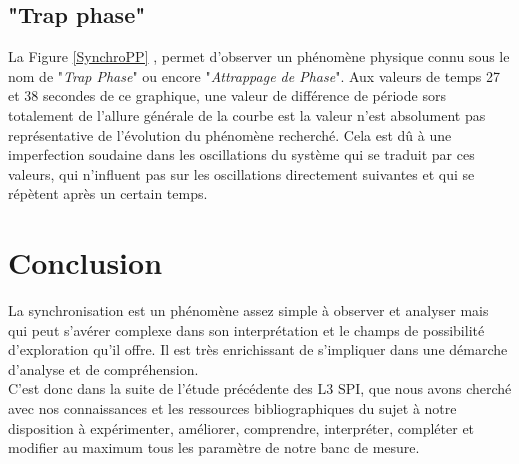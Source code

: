 \documentclass[a4paper,11pt]{report}
\begin{document}
\section{"Trap phase"}
La Figure \ref{SynchroPP} , permet d'observer un phénomène physique connu sous le nom de "{\it Trap Phase}" ou encore "{\it Attrappage de Phase}". Aux valeurs de temps 27 et 38 secondes de ce graphique, une valeur de différence de période sors totalement de l'allure générale de la courbe est la valeur n'est absolument pas représentative de l'évolution du phénomène recherché. Cela est dû à une imperfection soudaine dans les oscillations du système qui se traduit par ces valeurs, qui n'influent pas sur les oscillations directement suivantes et qui se répètent après un certain temps.
\chapter*{Conclusion}
La synchronisation est un phénomène assez simple à observer et analyser mais qui peut s'avérer complexe dans son interprétation et le champs de possibilité d'exploration qu'il offre. Il est très enrichissant de s'impliquer dans une démarche d'analyse et de compréhension.\\

C'est donc dans la suite de l'étude précédente des L3 SPI, que nous avons cherché avec nos connaissances et les ressources bibliographiques du sujet à notre disposition à expérimenter, améliorer, comprendre, interpréter, compléter et modifier au maximum tous les paramètre de notre banc de mesure.\\
\end{document}
